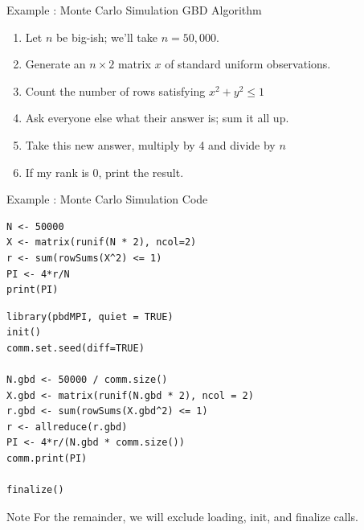 \begin{frame}[fragile]
  \begin{block}{Example \showex :  Monte Carlo Simulation GBD Algorithm}\pause
    \begin{enumerate}
     \item Let $n$ be big-ish; we'll take $n=50,000$.
     \item Generate an $n\times 2$ matrix $x$ of standard uniform observations.
     \item Count the number of rows satisfying $x^2 + y^2 \leq 1$
     \item Ask everyone else what their answer is; sum it all up.
     \item Take this new answer, multiply by 4 and divide by $n$
     \item If my rank is 0, print the result.
    \end{enumerate}
  \end{block}
\end{frame}


\begin{frame}
  \begin{exampleblock}{Example \showex :  Monte Carlo Simulation Code}\pause
\begin{lstlisting}[title=Serial Code]
N <- 50000
X <- matrix(runif(N * 2), ncol=2)
r <- sum(rowSums(X^2) <= 1)
PI <- 4*r/N
print(PI)
\end{lstlisting}

\begin{lstlisting}[title=Parallel Code]
library(pbdMPI, quiet = TRUE)
init()
comm.set.seed(diff=TRUE)

N.gbd <- 50000 / comm.size()
X.gbd <- matrix(runif(N.gbd * 2), ncol = 2)
r.gbd <- sum(rowSums(X.gbd^2) <= 1)
r <- allreduce(r.gbd)
PI <- 4*r/(N.gbd * comm.size())
comm.print(PI)

finalize()
\end{lstlisting}
  \end{exampleblock}
\end{frame}

\begin{frame}[fragile]
  \begin{block}{Note}\pause
    For the remainder, we will exclude loading, init, and finalize calls.
  \end{block}
\end{frame}



